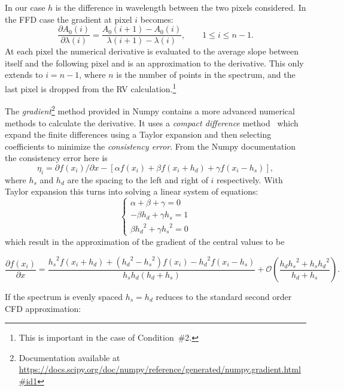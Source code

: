In our case \(h\) is the difference in wavelength between the two pixels considered.
In the {FFD} case the gradient at pixel \(i\) becomes:
\begin{equation}
\frac{\partial A_0(i)}{\partial\lambda(i)} = \frac{A_0(i+1) - A_0(i)}{\lambda(i+1)-\lambda(i)}, \hspace{2em} 1 \leq i \leq n-1.
\label{eq:ffd_precision}
\end{equation}
At each pixel the numerical derivative is evaluated to the average slope between itself and the following pixel and is an approximation to the derivative.
This only extends to \(i= n-1\), where \(n\) is the number of points in the spectrum, and the last pixel is dropped from the {RV} calculation.\footnote{This is important in the case of Condition~\#2.}


The \emph{gradient}\footnote{Documentation available at \href{https://docs.scipy.org/doc/numpy/reference/generated/numpy.gradient.html\#id1 }{https://docs.scipy.org/doc/numpy/reference/generated/numpy.gradient.html\#id1}}  method provided in Numpy contains a more advanced numerical methods to calculate the derivative.
It uses a \textit{compact difference} method~\citep{quarteroni_numerical_2000} which expand the finite differences using a Taylor expansion and then selecting coefficients to minimize the \textit{consistency error}.
From the Numpy documentation the consistency error here is \[\eta_i = \partial{f(x_i)}/\partial{x} -  [\alpha f(x_i) + \beta f(x_i +h_d) + \gamma f(x_i - h_s)],\] where \(h_s\) and \(h_d\) are the spacing to the left and right of \(i\) respectively.
With Taylor expansion this turns into solving a linear system of equations:
\[\begin{cases}
         \alpha + \beta + \gamma = 0\\
         -\beta {h_d} + \gamma {h_s} = 1\\
         \beta {h_{d}}^{2} + \gamma {h_{s}}^{2} = 0
    \end{cases}
\]
which result in the approximation of the gradient of the central values to be

\[\frac{\partial{f(x_i)}}{\partial{x}} = \frac{{h_{s}}^{2}f\left(x_{i} + {h_{d}}\right) + \left({h_{d}}^{2} - {h_{s}}^{2}\right)f\left(x_{i}\right) - {h_{d}}^{2}f\left(x_{i}-{h_{s}}\right)} {{h_{s}}{h_{d}}\left({h_{d}} + {h_{s}}\right)} + \mathcal{O}\left(\frac{h_{d}{h_{s}}^{2} + {h_{s}}{h_{d}}^{2}}{{h_{d}} + {h_{s}}}\right) \label{full_compact_difference}.\]

If the spectrum is evenly spaced ${h_{s}}={h_{d}}$  reduces to the standard second order {CFD} approximation:

